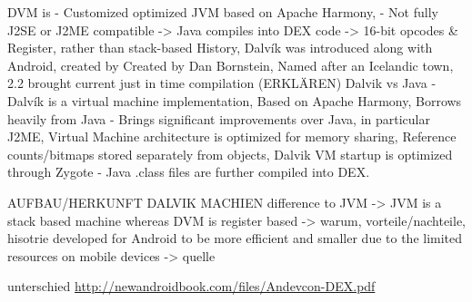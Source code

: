 %
DVM is
- Customized optimized JVM based on Apache Harmony,
- Not fully J2SE or J2ME compatible -> Java compiles into DEX code -> 16-bit opcodes & Register, rather than stack-based\newline
History, Dalvík was introduced along with Android, created by Created by Dan Bornstein, Named after an Icelandic town, 2.2 brought current just in time compilation (ERKLÄREN)\newline
Dalvik vs Java
- Dalvík is a virtual machine implementation, Based on Apache Harmony, Borrows heavily from Java
- Brings significant improvements over Java, in particular J2ME, Virtual Machine architecture is optimized for memory sharing, Reference counts/bitmaps stored separately from objects, Dalvik VM startup is optimized through Zygote
- Java .class files are further compiled into DEX.\newline
\cite{andevconDalvikART}
%



AUFBAU/HERKUNFT DALVIK MACHIEN\newline
difference to JVM -> JVM is a stack based machine whereas DVM is register based -> warum, vorteile/nachteile, hisotrie\newline
developed for Android to be more efficient and smaller due to the limited resources on mobile devices -> quelle\newline

unterschied \url{http://newandroidbook.com/files/Andevcon-DEX.pdf}\newline
